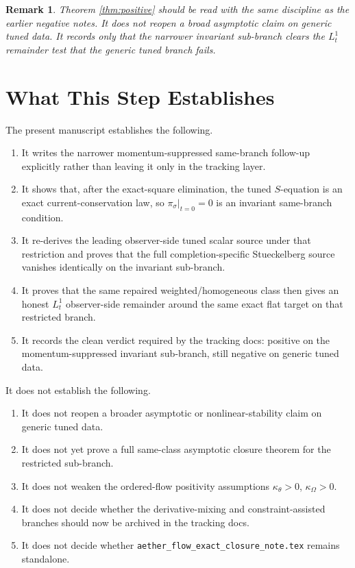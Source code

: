 \documentclass[11pt]{article}
\newtheorem{remark}{Remark}
\begin{document}
\begin{remark}
Theorem \ref{thm:positive} should be read with the same discipline as the earlier negative notes. It does \emph{not} reopen a broad asymptotic claim on generic tuned data. It records only that the narrower invariant sub-branch clears the \(L_t^1\) remainder test that the generic tuned branch fails.
\end{remark}

\section{What This Step Establishes}

The present manuscript establishes the following.
\begin{enumerate}
    \item It writes the narrower momentum-suppressed same-branch follow-up explicitly rather than leaving it only in the tracking layer.
    \item It shows that, after the exact-square elimination, the tuned \(S\)-equation is an exact current-conservation law, so \(\pi_\sigma|_{t=0}=0\) is an invariant same-branch condition.
    \item It re-derives the leading observer-side tuned scalar source under that restriction and proves that the full completion-specific Stueckelberg source vanishes identically on the invariant sub-branch.
    \item It proves that the same repaired weighted/homogeneous class then gives an honest \(L_t^1\) observer-side remainder around the same exact flat target on that restricted branch.
    \item It records the clean verdict required by the tracking docs: positive on the momentum-suppressed invariant sub-branch, still negative on generic tuned data.
\end{enumerate}

It does not establish the following.
\begin{enumerate}
    \item It does not reopen a broader asymptotic or nonlinear-stability claim on generic tuned data.
    \item It does not yet prove a full same-class asymptotic closure theorem for the restricted sub-branch.
    \item It does not weaken the ordered-flow positivity assumptions \(\kappa_\theta>0\), \(\kappa_\Omega>0\).
    \item It does not decide whether the derivative-mixing and constraint-assisted branches should now be archived in the tracking docs.
    \item It does not decide whether \texttt{aether\_flow\_exact\_closure\_note.tex} remains standalone.
\end{enumerate}
\end{document}
